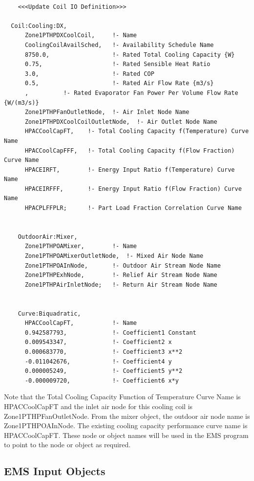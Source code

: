 \begin{lstlisting}

    <<<Update Coil IO Definition>>>

  Coil:Cooling:DX,
      Zone1PTHPDXCoolCoil,     !- Name
      CoolingCoilAvailSched,   !- Availability Schedule Name
      8750.0,                  !- Rated Total Cooling Capacity {W}
      0.75,                    !- Rated Sensible Heat Ratio
      3.0,                     !- Rated COP
      0.5,                     !- Rated Air Flow Rate {m3/s}
      ,          !- Rated Evaporator Fan Power Per Volume Flow Rate {W/(m3/s)}
      Zone1PTHPFanOutletNode,  !- Air Inlet Node Name
      Zone1PTHPDXCoolCoilOutletNode,  !- Air Outlet Node Name
      HPACCoolCapFT,    !- Total Cooling Capacity f(Temperature) Curve Name
      HPACCoolCapFFF,   !- Total Cooling Capacity f(Flow Fraction) Curve Name
      HPACEIRFT,        !- Energy Input Ratio f(Temperature) Curve Name
      HPACEIRFFF,       !- Energy Input Ratio f(Flow Fraction) Curve Name
      HPACPLFFPLR;      !- Part Load Fraction Correlation Curve Name


    OutdoorAir:Mixer,
      Zone1PTHPOAMixer,        !- Name
      Zone1PTHPOAMixerOutletNode,  !- Mixed Air Node Name
      Zone1PTHPOAInNode,       !- Outdoor Air Stream Node Name
      Zone1PTHPExhNode,        !- Relief Air Stream Node Name
      Zone1PTHPAirInletNode;   !- Return Air Stream Node Name


    Curve:Biquadratic,
      HPACCoolCapFT,           !- Name
      0.942587793,             !- Coefficient1 Constant
      0.009543347,             !- Coefficient2 x
      0.000683770,             !- Coefficient3 x**2
      -0.011042676,            !- Coefficient4 y
      0.000005249,             !- Coefficient5 y**2
      -0.000009720,            !- Coefficient6 x*y
\end{lstlisting}

Note that the Total Cooling Capacity Function of Temperature Curve Name is HPACCoolCapFT and the inlet air node for this cooling coil is Zone1PTHPFanOutletNode. From the mixer object, the outdoor air node name is Zone1PTHPOAInNode. The existing cooling capacity performance curve name is HPACCoolCapFT. These node or object names will be used in the EMS program to point to the node or object as required.

\subsection{EMS Input Objects}\label{ems-input-objects-001}

